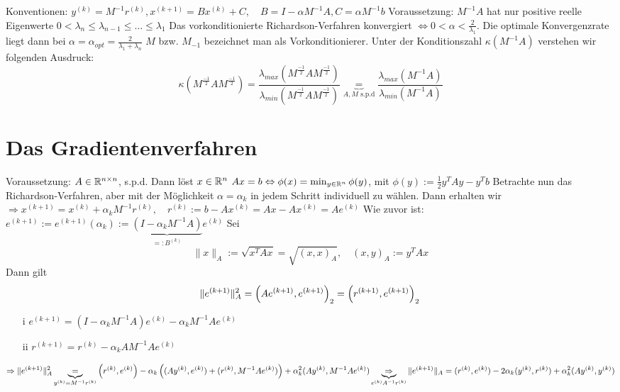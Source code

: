 
Konventionen: $y^{(k)} = M^{-1}r^{(k)}, x^{(k+1)} = Bx^{(k)} + C, \quad B=I -\alpha M^{-1}A, C=\alpha M^{-1}b$
Voraussetzung: $M^{-1}A$ hat nur positive reelle Eigenwerte $0<\lambda_n \leq \lambda_{n-1}\leq \dots \leq \lambda_1$
Das vorkonditionierte Richardson-Verfahren konvergiert $\Leftrightarrow 0<\alpha<\frac{2}{\lambda_1}$. Die optimale Konvergenzrate liegt dann bei $\alpha=\alpha_{opt} = \frac{2}{\lambda_1+\lambda_n}$
$M$ bzw. $M_{-1}$ bezeichnet man als Vorkonditionierer. Unter der Konditionszahl $\kappa\left( M^{-1}A \right)$ verstehen wir folgenden Ausdruck:
\[
  \kappa\left( M^{\frac{-1}{2}} A M^{\frac{-1}{2}} \right) = \frac{\lambda_{max}\left(  M^{\frac{-1}{2}} A M^{\frac{-1}{2}}  \right)}{\lambda_{min}\left(  M^{\frac{-1}{2}} A M^{\frac{-1}{2}}  \right)} \underbrace{=}_{A,M \text{ s.p.d}} \frac{\lambda_{max}(M^{-1}A)}{\lambda_{min}(M^{-1}A)}
\]

\section{Das Gradientenverfahren}
Voraussetzung: $A\in\mathbb{R}^{n\times n}$, s.p.d.
Dann löst $x\in\mathbb{R}^n$ $Ax=b \Leftrightarrow \phi(x) = \min_{y\in\mathbb{R}^n} \phi(y)$, mit $\phi(y) := \frac12 y^TAy - y^Tb$
Betrachte nun das Richardson-Verfahren, aber mit der Möglichkeit $\alpha=\alpha_k$ in jedem Schritt individuell zu wählen. Dann erhalten wir 
$\Rightarrow x^{(k+1)} = x^{(k)} + \alpha_k M^{-1}r^{(k)}, \quad r^{(k)}:=b-Ax^{(k)} =Ax-Ax^{(k)} = Ae^{(k)}$
Wie zuvor ist: $e^{(k+1)}:= e^{(k+1)}(\alpha_k):=\underbrace{\left( I-\alpha_k M^{-1}A \right)}_{=:B^{(k)}}e^{(k)}$
Sei 
\begin{equation}
  \|x\|_A := \sqrt{x^TAx} = \sqrt{(x,x)_A},\quad (x,y)_A := y^TAx
  \label{}
\end{equation}
Dann gilt
\begin{equation}
  \|e^{(k+1)}\|_A^2 = \left( Ae^{(k+1)}, e^{(k+1)} \right)_2 = \left( r^{(k+1)}, e^{(k+1)} \right)_2\\
  \label{}
\end{equation}
\begin{itemize}
  \item[i] $e^{(k+1)} = \left( I-\alpha_kM^{-1}A \right)e^{(k)} -\alpha_kM^{-1}Ae^{(k)}$
  \item[ii] $r^{(k+1)} = r^{(k)}-\alpha_kAM^{-1}Ae^{(k)}$  
\end{itemize}
\begin{equation}
  \Rightarrow \|e^{(k+1)}\|_A^2 \underbrace{=}_{y^{(k)} = M^{-1}r^{(k)}} \left( r^{(k)}, e^{(k)} \right) -\alpha_k \left( (Ay^{(k)},e^{(k)}) + (r^{(k)},M^{-1}Ae^{(k)}) \right) + \alpha_k^2 (Ay^{(k)}, M^{-1}Ae^{(k)})\\
  \underbrace{\Rightarrow}_{e^{(k)}A^{-1}r^{(k)}} \|e^{(k+1)}\|_A = (r^{(k)},e^{(k)}) - 2\alpha_k (y^{(k)},r^{(k)}) + \alpha_k^2 (Ay^{(k)}, y^{(k)})
  \label{}
\end{equation}

